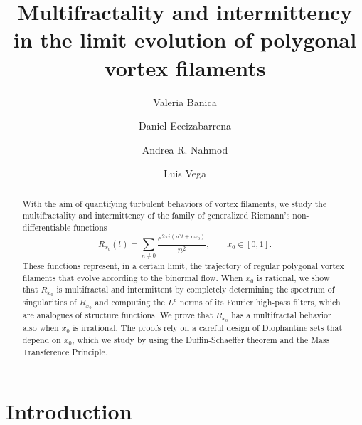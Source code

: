 \documentclass[11pt,reqno]{amsart}
\title{Multifractality and intermittency 
in the limit evolution of polygonal vortex filaments
}
\author[V. Banica]{Valeria Banica}
\author[D. Eceizabarrena]{Daniel Eceizabarrena}
\author[A. R. Nahmod]{Andrea R. Nahmod}
\author[L. Vega]{Luis Vega}
\theoremstyle{definition}
\begin{document}
\begin{abstract}
With the aim of quantifying turbulent behaviors of vortex filaments,  
we study the multifractality and intermittency of 
the family of generalized Riemann's non-differentiable functions
\begin{equation}
R_{x_0}(t) = \sum_{n \neq 0} \frac{e^{2\pi i ( n^2 t + n x_0 ) } }{n^2},
\qquad 
x_0 \in [0,1].
\end{equation}
These functions represent, in a certain limit, the trajectory of regular polygonal vortex filaments that evolve according to the binormal flow.
When $x_0$ is rational,  
we show that $R_{x_0}$ is multifractal and intermittent
by completely determining the spectrum of singularities of $R_{x_0}$ 
and computing the $L^p$ norms of its Fourier high-pass filters, which are analogues of structure functions. 
We prove that $R_{x_0}$ has a multifractal behavior 
also when $x_0$ is irrational. 
The proofs rely on a careful design of Diophantine sets that depend on $x_0$, which we study by %
using the Duffin-Schaeffer theorem and the Mass Transference Principle. 
\end{abstract}

\maketitle



\section{Introduction}
\end{document}
